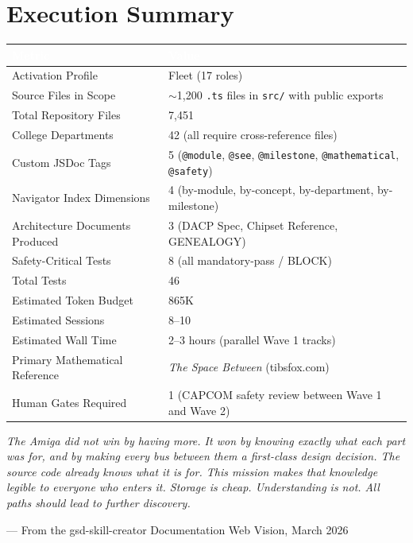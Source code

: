 \documentclass[11pt,letterpaper]{article}
\newcommand{\tableheader}[1]{\textbf{\sffamily\textcolor{white}{#1}}}
\begin{document}
\section{Execution Summary}

\begin{center}
\begin{tabularx}{\textwidth}{L{5cm}X}
\toprule
{}
\tableheader{Metric} & \tableheader{Value} \\
\midrule
Activation Profile & Fleet (17 roles) \\
Source Files in Scope & $\sim$1,200 \texttt{.ts} files in \texttt{src/} with public exports \\
Total Repository Files & 7,451 \\
College Departments & 42 (all require cross-reference files) \\
Custom JSDoc Tags & 5 (\texttt{@module}, \texttt{@see}, \texttt{@milestone}, \texttt{@mathematical}, \texttt{@safety}) \\
Navigator Index Dimensions & 4 (by-module, by-concept, by-department, by-milestone) \\
Architecture Documents Produced & 3 (DACP Spec, Chipset Reference, GENEALOGY) \\
Safety-Critical Tests & 8 (all mandatory-pass / BLOCK) \\
Total Tests & 46 \\
Estimated Token Budget & 865K \\
Estimated Sessions & 8--10 \\
Estimated Wall Time & 2--3 hours (parallel Wave 1 tracks) \\
Primary Mathematical Reference & \textit{The Space Between} (tibsfox.com) \\
Human Gates Required & 1 (CAPCOM safety review between Wave 1 and Wave 2) \\
\bottomrule
\end{tabularx}
\end{center}

\vspace{2em}

\begin{quotebox}
\textit{The Amiga did not win by having more. It won by knowing exactly what each part was for, and by making every bus between them a first-class design decision. The source code already knows what it is for. This mission makes that knowledge legible to everyone who enters it. Storage is cheap. Understanding is not. All paths should lead to further discovery.}

\vspace{0.8em}
{\small\sffamily\textcolor{subtlegray}{--- From the gsd-skill-creator Documentation Web Vision, March 2026}}
\end{quotebox}
\end{document}
